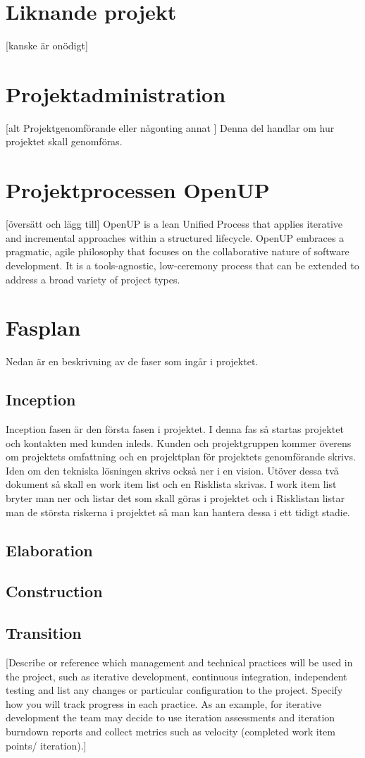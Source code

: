 \section{Liknande projekt}
[kanske är onödigt]
\section{Projektadministration}
[alt Projektgenomförande eller någonting annat ]
Denna del handlar om hur projektet skall genomföras.
\section{Projektprocessen OpenUP}
[översätt och lägg till]
OpenUP is a lean Unified Process that applies iterative and incremental approaches within a structured lifecycle. OpenUP embraces a pragmatic, agile philosophy that focuses on the collaborative nature of software development. It is a tools-agnostic, low-ceremony process that can be extended to address a broad variety of project types.
\section{Fasplan}
Nedan är en beskrivning av de faser som ingår i projektet.
\subsection*{Inception}
Inception fasen är den första fasen i projektet. I denna fas så startas projektet och kontakten med kunden inleds. Kunden och projektgruppen kommer överens om projektets omfattning och en projektplan för projektets genomförande skrivs. Iden om den tekniska lösningen skrivs också ner i en vision. Utöver dessa två dokument så skall en work item list och en Risklista skrivas. I work item list bryter man ner och listar det som skall göras i projektet och i Risklistan listar man de största riskerna i projektet så man kan hantera dessa i ett tidigt stadie.
\subsection*{Elaboration}
\subsection*{Construction}
\subsection*{Transition}
[Describe or reference which management and technical practices will be used in the project, such as iterative development, continuous integration, independent testing and list any changes or particular configuration to the project. Specify how you will track progress in each practice. As an example, for iterative development the team may decide to use iteration assessments and iteration burndown reports and collect metrics such as velocity (completed work item points/ iteration).]
